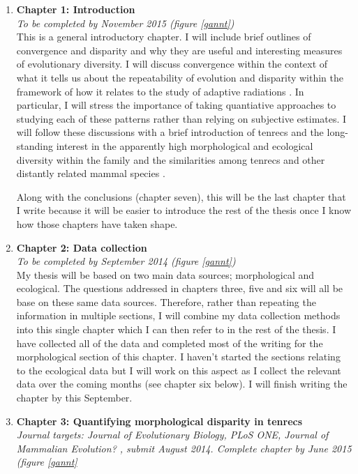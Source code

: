 \documentclass[12pt,a4paper]{article}
\begin{document}
\begin{enumerate}
\item \textbf{Chapter 1: Introduction}\\
\textit{To be completed by November 2015 (figure \ref{gannt})}\\

This is a general introductory chapter. I will include brief outlines of convergence and disparity and why they are useful and interesting measures of evolutionary diversity. I will discuss convergence within the context of what it tells us about the repeatability of evolution \citep[e.g][]{Blount2008} and disparity within the framework of how it relates to the study of adaptive radiations \citep{Losos2010a}. In particular, I will stress the importance of taking quantiative approaches to studying each of these patterns rather than relying on subjective estimates. I will follow these discussions with a brief introduction of tenrecs and the long-standing interest in the apparently high morphological and ecological diversity within the family and the similarities among tenrecs and other distantly related mammal species \citep[e.g.][]{Eisenberg1969, Soarimalala2011, Olson2013}. 

Along with the conclusions (chapter seven), this will be the last chapter that I write because it will be easier to introduce the rest of the thesis once I know how those chapters have taken shape. 

\item \textbf{Chapter 2: Data collection}\\
\textit{To be completed by September 2014 (figure \ref{gannt})}\\
My thesis will be based on two main data sources; morphological and ecological. The questions addressed in chapters three, five and six will all be base on these same data sources. Therefore, rather than repeating the information in multiple sections, I will combine my data collection methods into this single chapter which I can then refer to in the rest of the thesis. 
I have collected all of the data and completed most of the writing for the morphological section of this chapter. I haven't started the sections relating to the ecological data but I will work on this aspect as I collect the relevant data over the coming months (see chapter six below). I will finish writing the chapter by this September.

\item \textbf{Chapter 3: Quantifying morphological disparity in tenrecs}\\
\textit{Journal targets: Journal of Evolutionary Biology, PLoS ONE, Journal of Mammalian Evolution? , submit August 2014. 
Complete chapter by June 2015 (figure \ref{gannt}}\\


\end{enumerate}
\end{document}
